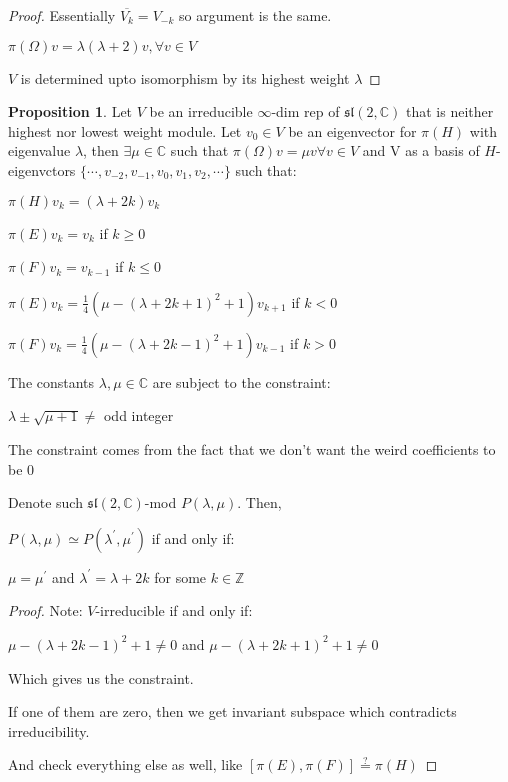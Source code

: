 \documentclass{article}
\theoremstyle{definition}
\newtheorem{proposition}{Proposition}
\begin{document}
\begin{proof}
    Essentially \(\overline{V_k} = V_{-k}\) so argument is the same.
    
    \(\pi(\Omega)v = \lambda ( \lambda + 2)v, \forall v\in V\)
    
    \(V\) is determined upto isomorphism by its highest weight \(\lambda\) 
\end{proof}

\begin{proposition}
    Let \(V\) be an irreducible \(\infty\)-dim rep of \(\mathfrak{sl}(2,\mathbb{C})\) that is neither highest nor lowest weight module. Let \(v_0\in V\) be an eigenvector for \(\pi(H)\) with eigenvalue \(\lambda\), then \(\exists \mu \in \mathbb{C}\) such that \(\pi(\Omega)v = \mu v \forall v\in V\) and V  as a basis of \(H\)-eigenvctors \(\{ \cdots, v_{-2}, v_{-1}, v_0, v_1, v_2,\cdots \} \) such that:
    
    \(\pi(H)v_k = (\lambda + 2k)v_k\)
    
    \(\pi(E)v_k = v_k\) if \(k \geq 0\) 

    \(\pi(F)v_k = v_{k-1}\) if \(k \leq 0\)
    
    \(\pi(E)v_k = \frac{1}{4}(\mu - (\lambda + 2k + 1)^2 + 1)v_{k+1}\) if \(k < 0\)
    
    \(\pi(F)v_k = \frac{1}{4}(\mu - (\lambda + 2k -1)^2 + 1)v_{k-1}\) if \(k > 0\) 
    
    The constants \(\lambda , \mu \in \mathbb{C}\) are subject to the constraint:
    
    \(\lambda \pm \sqrt{\mu + 1} \neq\) odd integer

    The constraint comes from the fact that we don't want the weird coefficients to be \(0\)
    
    Denote such \(\mathfrak{sl}(2,\mathbb{C})\)-mod \(P(\lambda , \mu )\). Then,
    
    \(P(\lambda , \mu) \simeq P(\lambda ^{\prime} , \mu ^{\prime} )\) if and only if:
    
    \(\mu = \mu ^{\prime} \) and \(\lambda^{\prime}  = \lambda + 2k\) for some \(k\in \mathbb{Z}\)   
\end{proposition}

\begin{proof}
    Note: \(V\)-irreducible if and only if:

    \(\mu - (\lambda + 2k- 1)^2 + 1\neq 0\) and \(\mu - (\lambda + 2k + 1)^2 +1 \neq 0\)
    
    Which gives us the constraint.
    
    If one of them are zero, then we get invariant subspace which contradicts irreducibility.

    And check everything else as well, like \([\pi(E), \pi(F)] \overset{?}{=} \pi(H)\)
\end{proof}
\end{document}
